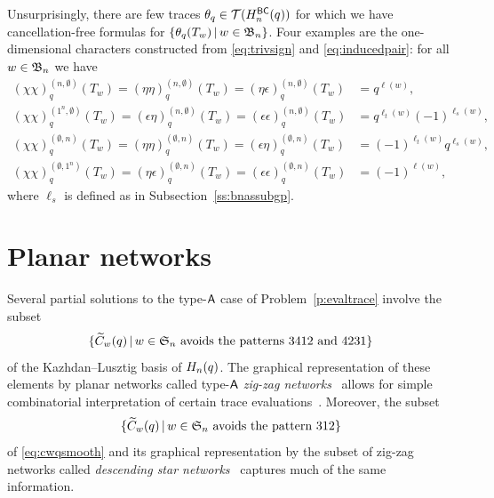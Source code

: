 \documentclass[11pt]{article}
\theoremstyle{definition}
\numberwithin{equation}{section}
\begin{document}
Unsurprisingly,
there are few traces $\theta_q \in \mathcal{T}(H_n^{\mathsf{BC}}(q))$
for which we have cancellation-free formulas
for $\{\theta_q(T_w) \,|\, w \in \mathfrak{B}_n \}$.
Four examples are the one-dimensional characters
constructed from \eqref{eq:trivsign} and
\eqref{eq:inducedpair}: for all $w \in \mathfrak{B}_n$ we have
\begin{equation*}
  \begin{aligned}
(\chi\chi)^{(n,\emptyset)}_q(T_w) =
(\eta\eta)^{(n,\emptyset)}_q(T_w) =
(\eta\epsilon)^{(n,\emptyset)}_q(T_w) &= q^{\ell(w)},\\
(\chi\chi)^{(1^n,\emptyset)}_q(T_w) =
(\epsilon\eta)^{(n,\emptyset)}_q(T_w) =
(\epsilon\epsilon)^{(n,\emptyset)}_q(T_w) &= q^{\ell_t(w)}(-1)^{\ell_s(w)},\\
(\chi\chi)^{(\emptyset,n)}_q(T_w) =
(\eta\eta)^{(\emptyset,n)}_q(T_w) =
(\epsilon\eta)^{(\emptyset,n)}_q(T_w) &= (-1)^{\ell_t(w)}q^{\ell_s(w)},\\
(\chi\chi)^{(\emptyset,1^n)}_q(T_w) =
(\eta\epsilon)^{(\emptyset,n)}_q(T_w) =
(\epsilon\epsilon)^{(\emptyset,n)}_q(T_w) &= (-1)^{\ell(w)},
\end{aligned}
\end{equation*}
where $\ell_s$ is defined as in Subsection~\ref{ss:bnassubgp}.

\section{Planar networks}\label{s:planarnet}


Several partial solutions to the type-$\mathsf{A}$ case of Problem~\ref{p:evaltrace}
involve
the subset
\begin{equation}\label{eq:cwqsmooth}
  \{ \wtc wq \,|\, w \in \sn \text{ \avoidsp} \}
\end{equation}
of the Kazhdan--Lusztig basis of $H_n(q)$.
The graphical representation of these elements
by
planar networks
called type-$\mathsf{A}$ {\em zig-zag networks}~\cite[\S 3]{SkanNNDCB}
allows for simple combinatorial interpretation of certain trace
evaluations~\cite[\S 5--10]{SkanNNDCB}.
Moreover, the subset
\begin{equation}\label{eq:cwqcodom}
  \{ \wtc wq \,|\, w \in \sn \text{ avoids the pattern } 312 \}
\end{equation}
of \eqref{eq:cwqsmooth} 
and its graphical representation by the subset of zig-zag networks
called {\em descending star networks}~\cite{SkanNNDCB}
captures much of the same information.
\end{document}
